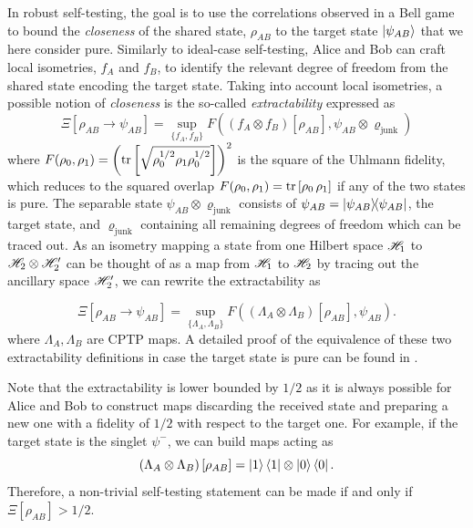 In robust self-testing, the goal is to use the correlations observed in a Bell game to bound the \textit{closeness} of the shared state, $\rho_{AB}$ to the target state $\ket{\psi_{AB}}$ that we here consider pure.
Similarly to ideal-case self-testing, Alice and Bob can craft local isometries, $f_A$ and $f_B$, to identify the relevant degree of freedom from the shared state encoding the target state.
Taking into account local isometries, a possible notion of \textit{closeness} is the so-called \textit{extractability} expressed as
\begin{equation}
	\Xi [\rho_{AB} \rightarrow \psi_{AB}] = \sup_{\{f_A,f_B\}} F((f_A \otimes f_B)[\rho_{AB}],\psi_{AB} \otimes \varrho_\text{junk})
	\label{eq:extractability_junk}
\end{equation}
where $F(\rho_0,\rho_1) = \left(\trr{\sqrt{\rho_0^{1/2}\rho_1\rho_0^{1/2}}}\right)^2$ is the square of the Uhlmann fidelity, which reduces to the squared overlap $F(\rho_0,\rho_1)=\trr{\rho_0\,\rho_1}$ if any of the two states is pure.
The separable state $\psi_{AB} \otimes \varrho_\text{junk}$ consists of $\psi_{AB} = \ketbra{\psi_{AB}}$, the target state, and $\varrho_\text{junk}$ containing all remaining degrees of freedom which can be traced out.
As an isometry mapping a state from one Hilbert space $\mathscr{H}_1$ to $\mathscr{H}_2 \otimes \mathscr{H}_2'$ can be thought of as a map from $\mathscr{H}_1$ to $\mathscr{H}_2$ by tracing out the ancillary space $\mathscr{H}_2'$, we can rewrite the extractability as
 
\begin{equation}
	\Xi [\rho_{AB} \rightarrow \psi_{AB}] = \sup_{\{\Lambda_A,\Lambda_B\}} F((\Lambda_A \otimes \Lambda_B)[\rho_{AB}],\psi_{AB}).
	\label{eq:extractability}
\end{equation}
where $\Lambda_A,\Lambda_B$ are \acrfull{CPTP} maps. 
A detailed proof of the equivalence of these two extractability definitions in case the target state is pure can be found in \cite{Sekatski2018}.


Note that the extractability is lower bounded by $1/2$ as it is always possible for Alice and Bob to construct maps discarding the received state and preparing a new one with a fidelity of $1/2$ with respect to the target one. 
For example, if the target state is the singlet $\psi^{-}$, we can build maps acting as
\begin{equation}	
	\left(\Lambda_A \otimes \Lambda_B\right)[\rho_{AB}] = \ket{1}\bra{1} \otimes \ket{0}\bra{0}.
\end{equation}
Therefore, a non-trivial self-testing statement can be made if and only if $\Xi[\rho_{AB}]>1/2$.


